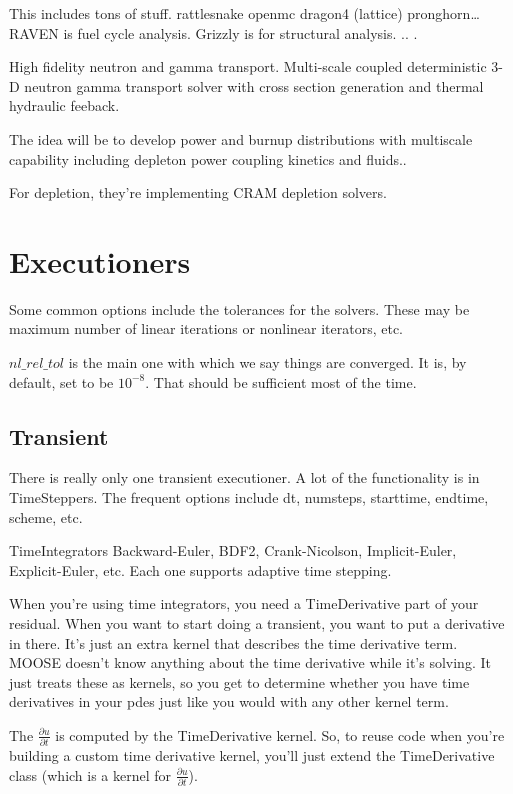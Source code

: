 This includes tons of stuff.
rattlesnake openmc dragon4 (lattice) pronghorn\ldots 
RAVEN is fuel cycle analysis. Grizzly is for structural analysis. .. .


High fidelity neutron and gamma transport. Multi-scale coupled deterministic 3-D 
neutron gamma transport solver with cross section generation and thermal 
hydraulic feeback. 

The idea will be to develop power and burnup distributions with multiscale 
capability including depleton power coupling kinetics and fluids.. 



For depletion, they're implementing CRAM depletion solvers. 

\section{Executioners}

Some common options include the tolerances for the solvers. These may be maximum 
number of linear iterations or nonlinear iterators, etc.

$nl\_rel\_tol$ is the main one with which we say things are converged. It is, by 
default, set to be $10^{-8}$. That should be sufficient most of the time.

\subsection{Transient}

There is really only one transient executioner. A lot of the functionality is in 
TimeSteppers. The frequent options include dt, numsteps, starttime, endtime, 
scheme, etc.

TimeIntegrators Backward-Euler, BDF2, Crank-Nicolson, Implicit-Euler, 
Explicit-Euler, etc. Each one supports adaptive time stepping. 

When you're using time integrators, you need a TimeDerivative part of your 
residual. When you want to start doing a transient, you want to put a derivative 
in there. It's just an extra kernel that describes the time derivative term. 
MOOSE doesn't know anything about the time derivative while it's solving. It 
just treats these as kernels, so you get to determine whether you have time 
derivatives in your pdes just like you would with any other kernel term. 


The $\frac{\partial u}{\partial t}$ is computed by the TimeDerivative kernel. 
So, to reuse code when you're building a custom time derivative kernel, you'll 
just extend the TimeDerivative class (which is a kernel for 
$\frac{\partial u}{\partial t}$).

